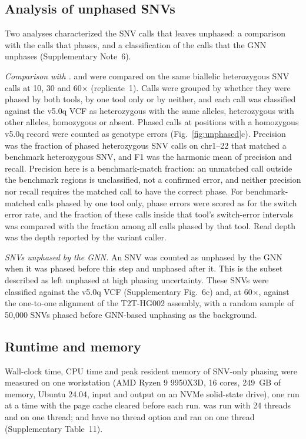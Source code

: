 \subsection*{Analysis of unphased SNVs}
Two analyses characterized the SNV calls that \toolname leaves unphased: a comparison with the calls that \whatshap phases, and a classification of the calls that the GNN unphases (Supplementary Note~6).

\emph{Comparison with \whatshap.}  \toolname and \whatshap were compared on the same biallelic heterozygous SNV calls at 10, 30 and 60$\times$ (replicate~1).  Calls were grouped by whether they were phased by both tools, by one tool only or by neither, and each call was classified against the v5.0q VCF as heterozygous with the same alleles, heterozygous with other alleles, homozygous or absent.  Phased calls at positions with a homozygous v5.0q record were counted as genotype errors (Fig.~\ref{fig:unphased}c).  Precision was the fraction of phased heterozygous SNV calls on chr1--22 that matched a benchmark heterozygous SNV, and F1 was the harmonic mean of precision and recall.  Precision here is a benchmark-match fraction: an unmatched call outside the benchmark regions is unclassified, not a confirmed error, and neither precision nor recall requires the matched call to have the correct phase.  For benchmark-matched calls phased by one tool only, phase errors were scored as for the switch error rate, and the fraction of these calls inside that tool's switch-error intervals was compared with the fraction among all calls phased by that tool.  Read depth was the depth reported by the variant caller.

\emph{SNVs unphased by the GNN.}  An SNV was counted as unphased by the GNN when it was phased before this step and unphased after it.  This is the subset described as left unphased at high phasing uncertainty.  These SNVs were classified against the v5.0q VCF (Supplementary Fig.~6c) and, at 60$\times$, against the one-to-one alignment of the T2T-HG002 assembly, with a random sample of 50,000 SNVs phased before GNN-based unphasing as the background.

\subsection*{Runtime and memory}
Wall-clock time, CPU time and peak resident memory of SNV-only phasing were measured on one workstation (AMD Ryzen 9 9950X3D, 16 cores, 249~GB of memory, Ubuntu 24.04, input and output on an NVMe solid-state drive), one run at a time with the page cache cleared before each run.  \toolname was run with 24 threads and on one thread; \whatshap and \hapcut have no thread option and ran on one thread (Supplementary Table~11).


